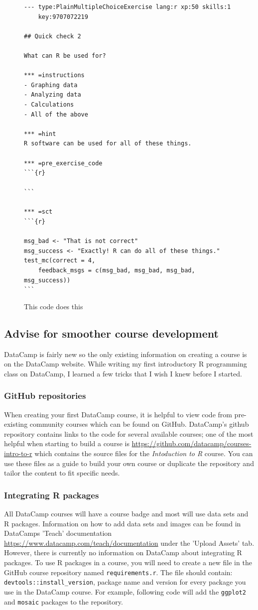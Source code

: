 \documentclass[12pt]{article}\usepackage[]{graphicx}\usepackage[]{color}
\begin{document}
\begin{figure}
\caption{This code does this}
\begin{Verbatim}[frame=single]
--- type:PlainMultipleChoiceExercise lang:r xp:50 skills:1
    key:9707072219

## Quick check 2

What can R be used for?

*** =instructions
- Graphing data
- Analyzing data
- Calculations
- All of the above

*** =hint
R software can be used for all of these things.

*** =pre_exercise_code
```{r}

```

*** =sct
```{r}

msg_bad <- "That is not correct"
msg_success <- "Exactly! R can do all of these things."
test_mc(correct = 4, 
    feedback_msgs = c(msg_bad, msg_bad, msg_bad, msg_success))
```
\end{Verbatim}
\end{figure}
\subsection{Advise for smoother course development}
DataCamp is fairly new so the only existing information on creating a course is on the DataCamp website. While writing my first introductory R programming class on DataCamp, I learned a few tricks that I wish I knew before I started. 
\subsubsection{GitHub repositories}
When creating your first DataCamp course, it is helpful to view code from pre-existing community courses which can be found on GitHub.
DataCamp's github repository contains links to the code for several available courses; one of the most helpful when starting to build a course 
is \url{https://github.com/datacamp/courses-intro-to-r} which contains the source files for the \textit{Intoduction to R} course.
You can use these files as a guide to build your own course or duplicate the repository and tailor the content to fit specific needs.

\subsubsection{Integrating R packages}
All DataCamp courses will have a course badge and most will use data sets and R packages. Information on how to add data sets and images
can be found in DataCamps 'Teach' documentation \url{https://www.datacamp.com/teach/documentation} under the 'Upload Assets' tab. However,
there is currently no information on DataCamp about integrating R packages. To use R packages in a course, you will need to create a new file
in the GitHub course repository named \texttt{requirements.r}. The file should contain: \texttt{devtools::install\_version}, package name and version for 
every package you use in the DataCamp course. For example, following code will add the \texttt{ggplot2} and \texttt{mosaic} packages to the repository.
\end{document}
